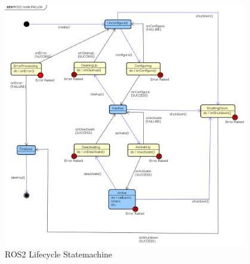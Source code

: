 	\begin{figure}[H]
		\centering
		\includegraphics[width=0.95\textwidth]{"Bilder/ros_lifecycle.png"}
		\caption{ROS2 Lifecycle Statemachine \cite{ros-2-lifecycle}}
		\label{fig:Background:Ros2LifecycleStateMachine}					
	\end{figure}

